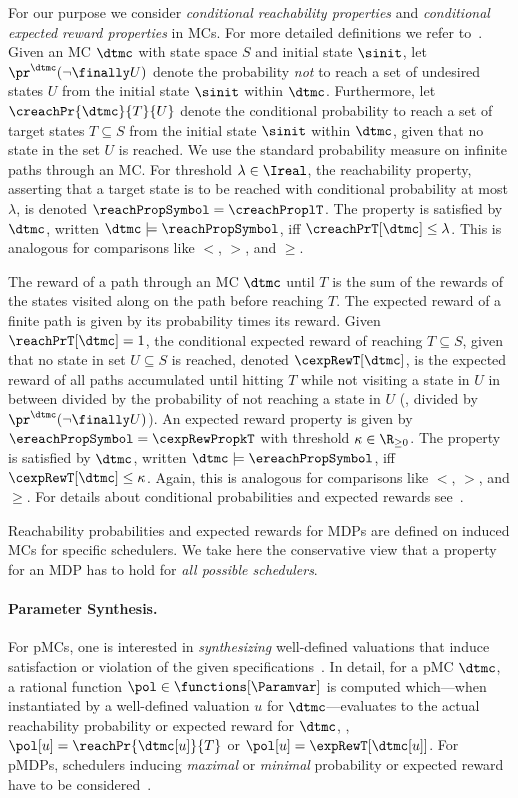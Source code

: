 For our purpose we consider \emph{conditional reachability properties} and \emph{conditional expected reward properties} in MCs.
For more detailed definitions we refer to~\cite[Ch.\ 10]{BK08}.
Given an MC $\dtmc$ with state space $S$ and initial state $\sinit$, let $\pr^{\dtmc}(\neg \finally U)$ denote the probability \emph{not} to reach a set of undesired states $U$ from the initial state $\sinit$ within $\dtmc$.
Furthermore, let $\creachPr{\dtmc}{T}{U}$ denote the conditional probability to reach a set of target states $T \subseteq S$ from the initial state $\sinit$ within $\dtmc$, given that no state in the set $U$ is reached.
We use the standard probability measure on infinite paths through an MC.
For threshold $\lambda\in \Ireal$, the reachability property, asserting that a target state is to be reached with conditional probability at most $\lambda$, is denoted $\reachPropSymbol = \creachProplT$.
The property is satisfied by $\dtmc$, written $\dtmc \models \reachPropSymbol$, iff $\creachPrT[\dtmc]\leq\lambda$.
This is analogous for comparisons like $<$, $>$, and $\geq$.

The reward of a path through an MC $\dtmc$ until $T$ is the sum of the rewards of the states visited along on the path before reaching $T$.
The expected reward of a finite path is given by its probability times its reward.
Given $\reachPrT[\dtmc] = 1$, the conditional expected reward of reaching $T \subseteq S$, given that no state in set $U \subseteq S$ is reached, denoted $\cexpRewT[\dtmc]$, is the expected reward of all paths accumulated until hitting $T$ while not visiting a state in $U$ in between divided by the probability of not reaching a state in $U$ (\ie, divided by $\pr^{\dtmc}(\neg \finally U)$).
An expected reward property is given by $\ereachPropSymbol = \cexpRewPropkT$ with threshold $\kappa \in \R_{\geq 0}$.
The property is satisfied by $\dtmc$, written $\dtmc \models \ereachPropSymbol$, iff $\cexpRewT[\dtmc]\leq\kappa$.
Again, this is analogous for comparisons like $<$, $>$, and $\geq$.
For details about conditional probabilities and expected rewards see~\cite{DBLP:conf/tacas/BaierKKM14}. 

Reachability probabilities and expected rewards for MDPs are defined on induced MCs for specific schedulers. 
We take here the conservative view that a property for an MDP has to hold for \emph{all possible schedulers}. 

\paragraph{Parameter Synthesis.}
For pMCs, one is interested in \emph{synthesizing} well-defined valuations that induce satisfaction or violation of the given specifications~\cite{dehnert-et-al-cav-2015}. In detail, for a pMC $\dtmc$, a rational function $\pol\in\functions[\Paramvar]$ is computed which---when instantiated by a well-defined valuation $u$ for $\dtmc$---evaluates to the actual reachability probability or expected reward for $\dtmc$, \ie, $\pol[u]=\reachPr{\dtmc[u]}{T}$ or $\pol[u]=\expRewT[{\dtmc[u]}]$. For pMDPs, schedulers inducing \emph{maximal} or \emph{minimal} probability or expected reward have to be considered~\cite{quatmann-et-al-techreport-2016}.


